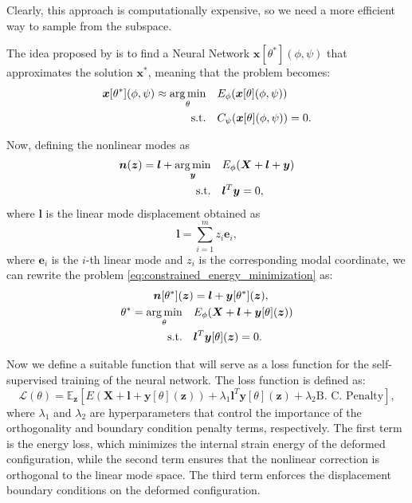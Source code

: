 Clearly, this approach is computationally expensive, so we need a more efficient way to sample from the subspace.

The idea proposed by \cite{Wang_Du_Coros_Thomaszewski_2024} is to find a Neural Network \( \bm{x}[\theta^*](\phi, \psi) \) that approximates the solution \( \bm{x}^* \), meaning that the problem becomes:
\begin{align*}
    \bm{x}[\theta^*](\phi, \psi) \approx \underset{\theta}{\operatorname*{arg\,min}} \quad & E_\phi(\bm{x}[\theta](\phi, \psi)) \\
    \text{s.t.} \quad & C_\psi(\bm{x}[\theta](\phi, \psi)) = 0.
\end{align*}

Now, defining the nonlinear modes as 
\begin{align}
    \bm{n}(\bm{z}) = \bm{l} + \operatorname*{arg\,min}_{\bm{y}} \quad & E_\phi(\bm{X} + \bm{l} + \bm{y}) \\ 
    \text{s.t.} \quad & \bm{l}^T \bm{y} = 0,
\end{align}
where \( \bm{l} \) is the linear mode displacement obtained as
\begin{equation}
    \bm{l} = \sum_{i=1}^m z_i \bm{e}_i,
\end{equation}
where \( \bm{e}_i \) is the $i$-th linear mode and \( z_i \) is the corresponding modal coordinate, we can rewrite the problem \ref{eq:constrained_energy_minimization} as:
\begin{align*}
    \bm{n}[\theta^*](\bm{z}) &= \bm{l} + \bm{y}[\theta^*](\bm{z}), \\
    \theta^* = \underset{\theta}{\operatorname*{arg\,min}} \quad & E_\phi(\bm{X} + \bm{l} + \bm{y}[\theta](\bm{z})) \\
    \text{s.t.} \quad & \bm{l}^T \bm{y}[\theta](\bm{z}) = 0.
\end{align*}

Now we define a suitable function that will serve as a loss function for the self-supervised training of the neural network. The loss function is defined as:
\begin{equation}
    \mathcal{L}(\theta) = \mathbb{E}_{\bm{z}} \left[ E(\bm{X} + \bm{l} + \bm{y}[\theta](\bm{z})) + \lambda_1 \bm{l}^T \bm{y}[\theta](\bm{z}) + \lambda_2 \text{B. C. Penalty} \right],
\end{equation}
where \( \lambda_1 \) and \( \lambda_2 \) are hyperparameters that control the importance of the orthogonality and boundary condition penalty terms, respectively. The first term is the energy loss, which minimizes the internal strain energy of the deformed configuration, while the second term ensures that the nonlinear correction is orthogonal to the linear mode space. The third term enforces the displacement boundary conditions on the deformed configuration.

